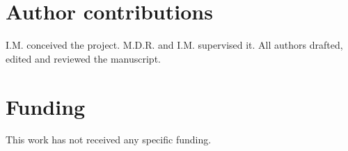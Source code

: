 \documentclass{article}
\begin{document}
\section*{Author contributions}

I.M. conceived the project. M.D.R. and I.M. supervised it. All authors drafted, edited and reviewed the manuscript.

\section*{Funding}

This work has not received any specific funding.

  
  

\clearpage

\appendix


\end{document}
